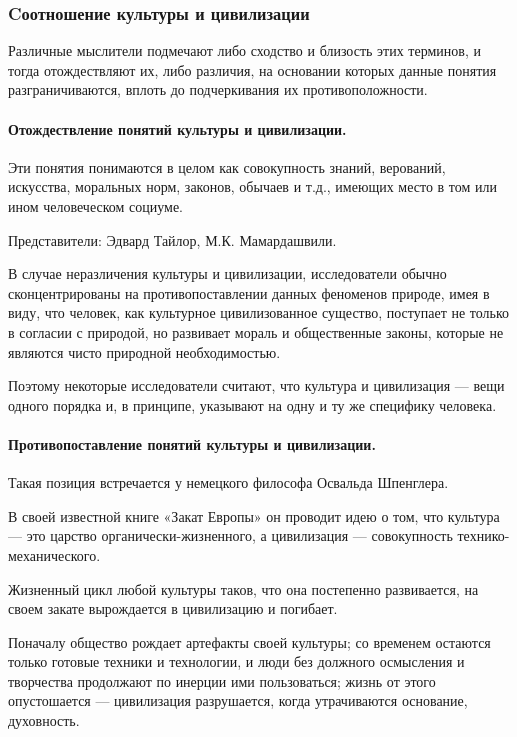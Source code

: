 \subsubsection{Cоотношение культуры и цивилизации}
Различные мыслители подмечают либо сходство и близость этих терминов, и
тогда отождествляют их, либо различия, на основании которых данные понятия
разграничиваются, вплоть до подчеркивания их противоположности. 

\paragraph{Отождествление понятий культуры и цивилизации.} 

Эти понятия понимаются в целом как совокупность знаний, верований, искусства,
моральных норм, законов, обычаев и т.д., имеющих место в том или ином
человеческом социуме. 

Представители: Эдвард Тайлор, М.К. Мамардашвили. 

В случае неразличения культуры и цивилизации, исследователи обычно
сконцентрированы на противопоставлении данных феноменов природе, имея в виду,
что человек, как культурное цивилизованное существо, поступает не только в согласии 
с природой, но развивает мораль и
общественные законы, которые не являются чисто природной необходимостью. 

Поэтому некоторые исследователи считают, что культура и цивилизация — вещи одного
порядка и, в принципе, указывают на одну и ту же специфику человека.

\paragraph{Противопоставление понятий культуры и цивилизации.}

Такая позиция встречается у немецкого философа Освальда Шпенглера. 

В своей известной книге «Закат Европы» он
проводит идею о том, что культура — это царство органически-жизненного, а
цивилизация — совокупность технико-механического. 

Жизненный цикл любой
культуры таков, что она постепенно развивается, на своем закате вырождается в
цивилизацию и погибает. 

Поначалу общество рождает артефакты своей культуры; со временем остаются только готовые техники и технологии, и люди без должного осмысления и творчества
продолжают по инерции ими пользоваться; жизнь от этого опустошается --- цивилизация разрушается, когда утрачиваются основание, духовность. 

